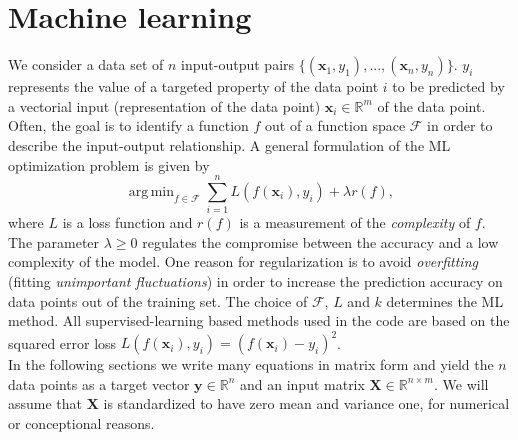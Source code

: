 \documentclass[11pt, a4paper, parskip=half*, bibliography=totoc, cleardoublepage=empty, final,
numbers=noenddot]{scrbook}
\DeclareMathOperator*{\argmin}{arg\,min}
\begin{document}
\chapter{Machine learning}
We consider a data set of $n$ input-output pairs $\{(\bm{x}_1, y_1), ..., (\bm{x}_n, y_n)\}$. $y_i$ represents the value of a targeted property of the data point $i$ to be predicted by a vectorial input (representation of the data point) $\bm{x}_i \in \mathbb{R}^m$ of the data point. Often, the goal is to identify a function $f$ out of a function space $\mathcal{F}$ in order to describe the input-output relationship. A general formulation of the ML optimization problem is given by 
\begin{equation}
\argmin_{f \in \mathcal{F}} \sum_{i=1}^n L(f(\bm{x}_i), y_i)+\lambda r(f),
\label{eq:opt-ml}
\end{equation}
where $L$ is a loss function and $r(f)$ is a measurement of the \textit{complexity} of $f$. The parameter $\lambda \geq 0$ regulates the compromise between the accuracy and a low complexity of the model. One reason for regularization is to avoid \textit{overfitting} (fitting \textit{unimportant fluctuations}) in order to increase the prediction accuracy on data points out of the training set. The choice of $\mathcal{F}$, $L$ and $k$ determines the ML method. All supervised-learning based methods used in the code are based on the squared error loss $ L(f(\bm{x}_i),  y_i) = (f(\bm{x}_i)- y_i)^2$.\\

In the following sections we write many equations in matrix form and yield the $n$ data points as a target vector $\bm{y} \in \mathbb{R}^n$ and an input matrix $\bm{X} \in \mathbb{R}^{n \times m}$. We will assume that $\bm{X}$ is standardized to have zero mean and variance one, for numerical or conceptional reasons.
\end{document}
